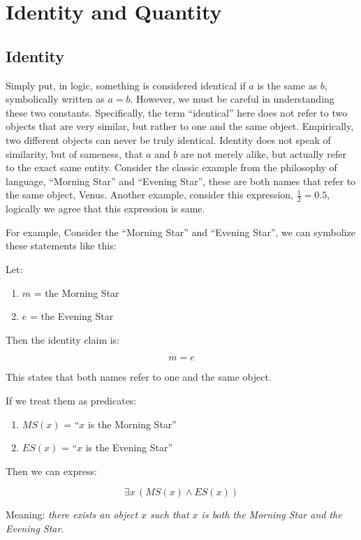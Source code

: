 \documentclass[12pt,a4paper,openany]{article}
\begin{document}

\section{Identity and Quantity} 

\subsection{Identity}
\label{identity}

Simply put, in logic, something is considered identical if \(a\) is the
same as \(b\), symbolically written as \(a = b\). However, we must be
careful in understanding these two constants. Specifically, the term
``identical'' here does not refer to two objects that are very similar,
but rather to one and the same object. Empirically, two
different objects can never be truly identical. Identity does not speak
of similarity, but of sameness, that \(a\) and \(b\) are not merely
alike, but actually refer to the exact same entity. Consider the classic
example from the philosophy of language, ``Morning Star'' and ``Evening
Star'', these are both names that refer to the same object, Venus.
Another example, consider this expression, \(\frac{1}{2} = 0.5\),
logically we agree that this expression is same.

For example, Consider the ``Morning Star'' and ``Evening Star'', we can
symbolize these statements like this:

Let:
\begin{enumerate}
    \item $m$ = the Morning Star
    \item $e$ = the Evening Star
\end{enumerate}

Then the identity claim is:

\[ m = e \]

This states that both names refer to one and the same object.

If we treat them as predicates:
\begin{enumerate}
    \item $MS(x)$ = ``$x$ is the Morning Star''
    \item $ES(x)$ = ``$x$ is the Evening Star''
\end{enumerate}

Then we can express:

\[\exists x \, (MS(x) \land ES(x))\]

Meaning: \emph{there exists an object \(x\) such that \(x\) is both the
Morning Star and the Evening Star}.
\end{document}
